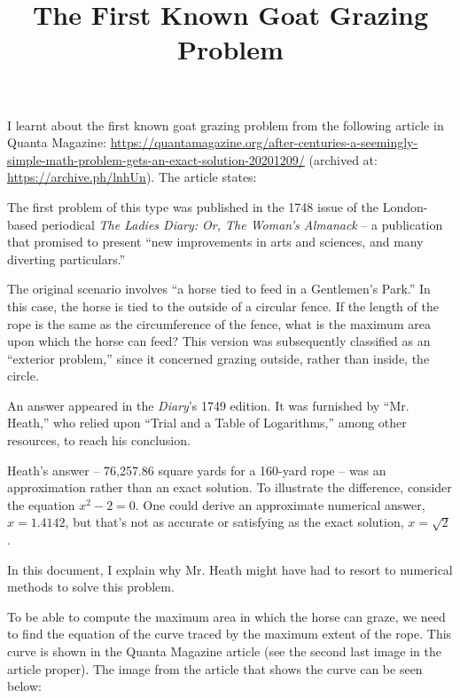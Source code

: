 \documentclass{article}
\date{}
\title{The First Known Goat Grazing Problem}
\begin{document}
\maketitle

I learnt about the first known goat grazing problem from the following article in Quanta Magazine: \url{https://quantamagazine.org/after-centuries-a-seemingly-simple-math-problem-gets-an-exact-solution-20201209/} (archived at: \url{https://archive.ph/lnhUn}). The article states:

\begin{displayquote}
The first problem of this type was published in the 1748 issue of the London-based periodical \textit{The Ladies Diary: Or, The Woman's Almanack} -- a publication that promised to present ``new improvements in arts and sciences, and many diverting particulars.''

The original scenario involves ``a horse tied to feed in a Gentlemen's Park.'' In this case, the horse is tied to the outside of a circular fence. If the length of the rope is the same as the circumference of the fence, what is the maximum area upon which the horse can feed? This version was subsequently classified as an ``exterior problem,'' since it concerned grazing outside, rather than inside, the circle.

An answer appeared in the \textit{Diary}'s 1749 edition. It was furnished by ``Mr. Heath,'' who relied upon ``Trial and a Table of Logarithms,'' among other resources, to reach his conclusion.

Heath's answer -- 76,257.86 square yards for a 160-yard rope -- was an approximation rather than an exact solution. To illustrate the difference, consider the equation $x^2 - 2 = 0$. One could derive an approximate numerical answer, $x = 1.4142$, but that's not as accurate or satisfying as the exact solution, $x = \sqrt{2}$.
\end{displayquote}

In this document, I explain why Mr. Heath might have had to resort to numerical methods to solve this problem.

To be able to compute the maximum area in which the horse can graze, we need to find the equation of the curve traced by the maximum extent of the rope. This curve is shown in the Quanta Magazine article (see the second last image in the article proper). The image from the article that shows the curve can be seen below:
\end{document}
